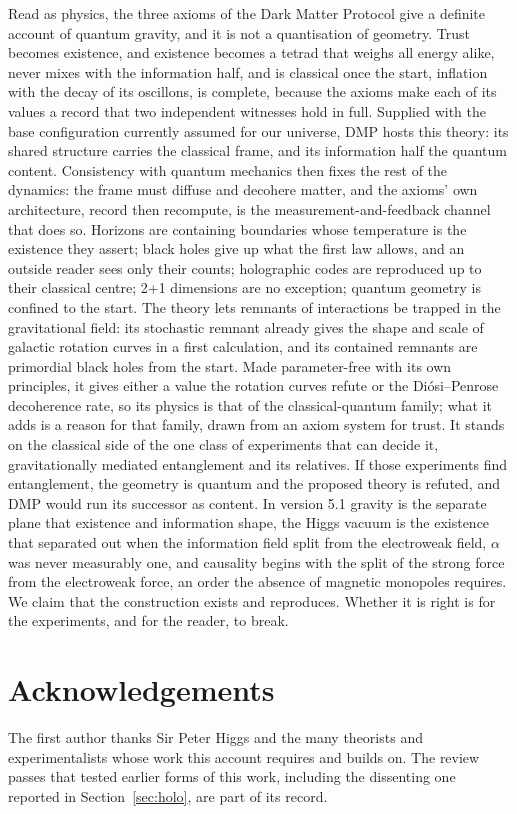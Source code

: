 \documentclass[11pt,a4paper]{article}
\theoremstyle{definition}
\theoremstyle{remark}
\newcommand{\nw}[1]{{\color{newc}#1}}
\newcommand{\vtag}{{\color{newc}\textsf{\scriptsize[v5.1]}}}
\theoremstyle{definition}
\begin{document}
Read as physics, the three axioms of the Dark Matter Protocol give a definite account of quantum gravity, and it is not a quantisation of
geometry. Trust becomes existence, and existence becomes a tetrad that weighs all energy alike, never mixes with the information half, and
is classical once the start, inflation with the decay of its oscillons, is complete, because the axioms make each of its values a record
that two independent witnesses hold in full. Supplied with the base configuration currently assumed for our universe, DMP hosts this
theory: its shared structure carries the classical frame, and its information half the quantum content. Consistency with quantum
mechanics then fixes the rest of the dynamics: the frame must diffuse and decohere matter, and the axioms' own architecture, record then
recompute, is the measurement-and-feedback channel that does so. Horizons are containing boundaries whose temperature is the existence they
assert; black holes give up what the first law allows, and an outside reader sees only their counts; holographic codes are reproduced up to
their classical centre; 2+1 dimensions are no exception; quantum geometry is confined to the start. The theory lets remnants of interactions
be trapped in the gravitational field: its stochastic remnant already gives the shape and scale of galactic rotation curves in a first
calculation, and its contained remnants are primordial black holes from the start. Made parameter-free with its own
principles, it gives either a value the rotation curves refute or the Di\'osi--Penrose decoherence rate, so its physics is that of the
classical-quantum family; what it adds is a reason for that family, drawn from an axiom system for trust. It stands on the classical side
of the one class of experiments that can decide it, gravitationally mediated entanglement and its relatives. If those experiments find entanglement, the
geometry is quantum and the proposed theory is refuted, and DMP would run its successor as content.
\nw{\vtag{} In version 5.1 gravity is the separate plane that existence and information shape, the Higgs vacuum is the existence that
separated out when the information field split from the electroweak field, $\alpha$ was never measurably one, and causality begins with
the split of the strong force from the electroweak force, an order the absence of magnetic monopoles requires.} We claim that the
construction exists
and reproduces. Whether it is right is for the experiments, and for the reader, to break.

\section*{Acknowledgements}
The first author thanks Sir Peter Higgs and the many theorists and experimentalists whose work this account requires and builds on. The
review passes that tested earlier forms of this work, including the dissenting one reported in Section~\ref{sec:holo}, are part of its
record.
\end{document}
